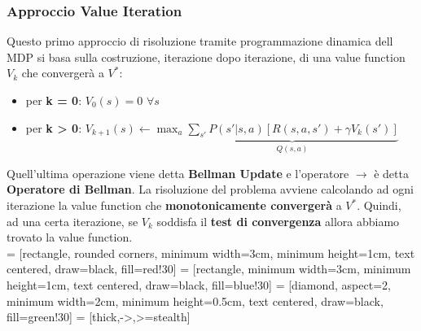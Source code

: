 \subsubsection{Approccio Value Iteration}
Questo primo approccio di risoluzione tramite programmazione dinamica dell MDP si basa sulla costruzione, iterazione dopo
iterazione, di una value function $V_k$ che convergerà a $V^*$:
\begin{itemize}
    \item per \textbf{k = 0}: $V_0(s) = 0$  $\forall s$
    \item per \textbf{k > 0}: $V_{k+1}(s) \leftarrow \max_{a}\underbrace{\sum_{s'} P(s'|s,a)[R(s,a,s') + \gamma V_k(s')]}_{Q(s,a)}$
\end{itemize}
Quell'ultima operazione viene detta \textbf{Bellman Update} e l'operatore $\rightarrow$ è detta \textbf{Operatore di Bellman}.
La risoluzione del problema avviene calcolando ad ogni iterazione la value function che \textbf{monotonicamente convergerà} a
$V^*$. Quindi, ad una certa iterazione, se $V_k$ soddisfa il \textbf{test di convergenza} allora abbiamo trovato la value function.\\

 = [rectangle, rounded corners, minimum width=3cm, minimum height=1cm, text centered, draw=black, fill=red!30]
 = [rectangle, minimum width=3cm, minimum height=1cm, text centered, draw=black, fill=blue!30]
 = [diamond, aspect=2, minimum width=2cm, minimum height=0.5cm, text centered, draw=black, fill=green!30]
 = [thick,->,>=stealth]


\begin{center}
\end{center}

